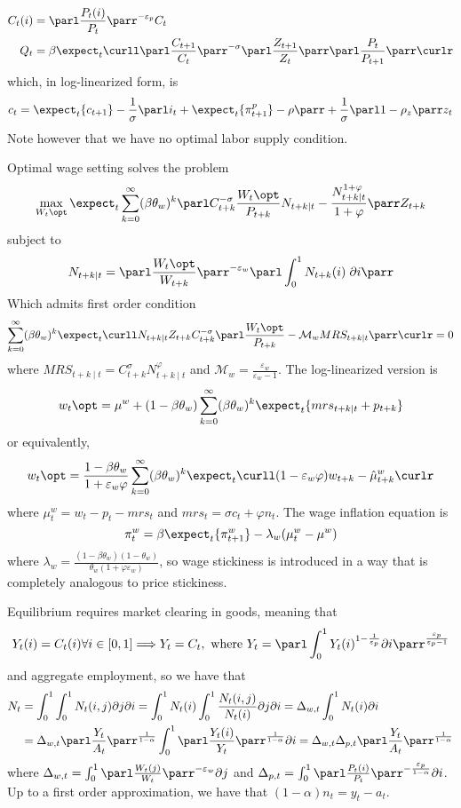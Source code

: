 \documentclass[10pt]{article}
\begin{document}
\begin{model}
	\begin{align*}
		C_t(i) &= \parl \frac{P_t(i)}{P_t}\parr^{-\varepsilon_p}C_t \\ Q_t &= \beta \expect_t \curll \parl \frac{C_{t+1}}{C_t}\parr^{-\sigma}\parl \frac{Z_{t+1}}{Z_t}\parr \parl \frac{P_t}{P_{t+1}}\parr\curlr
	\end{align*}
	which, in log-linearized form, is\[c_t = \expect_t\{c_{t+1}\} - \frac{1}{\sigma} \parl i_t + \expect_t\{\pi_{t+1}^p\}-\rho\parr + \frac{1}{\sigma} \parl 1-\rho_z\parr z_t\]Note however that we have no optimal labor supply condition.
	
	Optimal wage setting solves the problem \[\max_{W_t\opt} \expect_t \sum_{k=0}^\infty (\beta \theta_w)^k \parl C_{t+k}^{-\sigma} \frac{W_t\opt}{P_{t+k}}N_{t+k\mid t} - \frac{N_{t+k\mid t}^{1+\varphi}}{1+\varphi}\parr Z_{t+k}\]subject to\[N_{t+k\mid t} = \parl \frac{W_t\opt}{W_{t+k}}\parr^{-\varepsilon_w} \parl \int_0^1 N_{t+k}(i)\;\partial i\parr\]Which admits first order condition \[\sum_{k=0}^\infty (\beta\theta_w)^k \expect_t \curll N_{t+k\mid t} Z_{t+k} C_{t+k}^{-\sigma} \parl \frac{W_t\opt}{P_{t+k}} - \mathcal{M}_w MRS_{t+k\mid t}\parr\curlr = 0\]where $MRS_{t+k\mid t} = C_{t+k}^\sigma N_{t+k\mid t}^\varphi$ and $\mathcal{M}_w = \frac{\varepsilon_w}{\varepsilon_w-1}$. The log-linearized version is \[w_t\opt = \mu^w + (1-\beta\theta_w) \sum_{k=0}^\infty (\beta\theta_w)^k \expect_t\{mrs_{t+k\mid t} + p_{t+k}\}\]or equivalently, \[w_t\opt = \frac{1-\beta\theta_w}{1+\varepsilon_w\varphi} \sum_{k=0}^\infty (\beta\theta_w)^k \expect_t\curll (1-\varepsilon_w\varphi)w_{t+k} - \hat{\mu}_{t+k}^w\curlr\]where $\mu_t^w = w_t - p_t - mrs_t$ and $mrs_t = \sigma c_t + \varphi n_t$. The wage inflation equation is \[\pi_t^w = \beta \expect_t\{\pi_{t+1}^w\} - \lambda_w (\mu_t^w - \mu^w)\]where $\lambda_w = \frac{(1-\beta\theta_w)(1-\theta_w)}{\theta_w(1+\varphi \varepsilon_w)}$, so wage stickiness is introduced in a way that is completely analogous to price stickiness. 
	
	Equilibrium requires market clearing in goods, meaning that \[Y_t(i) = C_t(i) \forall i \in [0,1] \Longrightarrow Y_t = C_t,\text{ where } Y_t = \parl \int_0^1 Y_t(i)^{1-\frac{1}{\varepsilon_p}}\partial i\parr^{\frac{\varepsilon_p}{\varepsilon_p-1}}\]and aggregate employment, so we have that 
	\begin{align*}
		N_t &= \int_0^1 \int_0^1 N_t(i,j)\partial j \partial i = \int_0^1 N_t(i) \int_0^1 \frac{N_t(i,j)}{N_t(i)}\partial j\partial i = \Delta_{w,t} \int_0^1 N_t(i)\partial i \\ 
		&= \Delta_{w,t} \parl \frac{Y_t}{A_t}\parr^{\frac{1}{1-\alpha}} \int_0^1 \parl \frac{Y_t(i)}{Y_t}\parr^{\frac{1}{1-\alpha}}\partial i = \Delta_{w,t} \Delta_{p,t} \parl \frac{Y_t}{A_t}\parr^{\frac{1}{1-\alpha}}
 	\end{align*}
 	where $\Delta_{w,t} = \int_0^1 \parl \frac{W_t(j)}{W_t}\parr^{-\varepsilon_w}\partial j$ and $\Delta_{p,t} = \int_0^1 \parl \frac{P_t(i)}{P_t}\parr^{-\frac{\varepsilon_p}{1-\alpha}}\partial i$. Up to a first order approximation, we have that $(1-\alpha)n_t = y_t - a_t$.
 	

\end{model}
\end{document}
